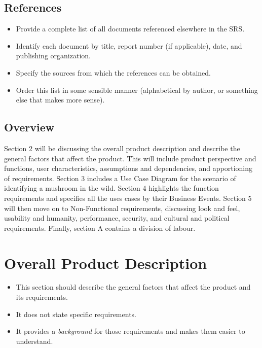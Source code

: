 \documentclass[]{article}
\begin{document}
\subsection{References}
\label{sub:references}
\begin{itemize}
	\item Provide a complete list of all documents referenced elsewhere in the SRS.
	\item Identify each document by title, report number (if applicable), date, and publishing organization.
	\item Specify the sources from which the references can be obtained.
	\item Order this list in some sensible manner (alphabetical by author, or something else that makes more sense).
\end{itemize}

\subsection{Overview}
\label{sub:overview}

Section 2 will be discussing the overall product description and describe the general factors that affect the product. This will include product perspective and functions, user characteristics, assumptions and dependencies, and apportioning of requirements. Section 3 includes a Use Case Diagram for the scenario of identifying a mushroom in the wild. Section 4 highlights the function requirements and specifies all the uses cases by their Business Events. Section 5 will then move on to Non-Functional requirements, discussing look and feel, usability and humanity, performance, security, and cultural and political requirements. Finally, section A contains a division of labour.



\section{Overall Product Description}
\label{sec:overall_description}

\begin{itemize}
	\item This section should describe the general factors that affect the product and its requirements. 
	\item It does not state specific requirements.
	\item It provides a \emph{background} for those requirements and makes them easier to understand.
\end{itemize}
\end{document}
